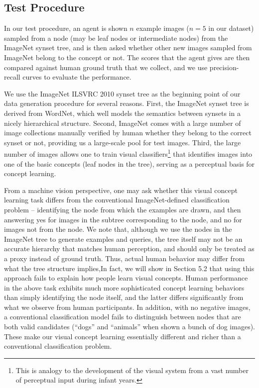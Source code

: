 \subsection{Test Procedure}

In our test procedure, an agent is shown $n$ example images ($n=5$ in our dataset) sampled from a node (may be leaf nodes or intermediate nodes) from the ImageNet synset tree, and is then asked whether other new images sampled from ImageNet belong to the concept or not. The scores that the agent gives are then compared against human ground truth that we collect, and we use precision-recall curves to evaluate the performance.

We use the ImageNet ILSVRC 2010 synset tree as the beginning point of our data generation procedure for several reasons. First, the ImageNet synset tree is derived from WordNet, which well models the semantics between synsets in a nicely hierarchical structure. Second, ImageNet comes with a large number of image collections manually verified by human whether they belong to the correct synset or not, providing us a large-scale pool for test images. Third, the large number of images allows one to train visual classifiers\footnote{This is analogy to the development of the visual system from a vast number of perceptual input during infant years.} that identifies images into one of the basic concepts (leaf nodes in the tree), serving as a perceptual basis for concept learning.

From a machine vision perspective, one may ask whether this visual concept learning task differs from the conventional ImageNet-defined classification problem -- identifying the node from which the examples are drawn, and then answering yes for images in the subtree corresponding to the node, and no for images not from the node. We note that, although we use the nodes in the ImageNet tree to generate examples and queries, the tree itself may not be an accurate hierarchy that matches human perception, and should only be treated as a proxy instead of ground truth. Thus, actual human behavior may differ from what the tree structure implies,In fact, we will show in Section 5.2 that using this approach fails to explain how people learn visual concepts. Human performance in the above task exhibits much more sophisticated concept learning behaviors than simply identifying the node itself, and the latter differs significantly from what we observe from human participants. In addition, with no negative images, a conventional classification model fails to distinguish between nodes that are both valid candidates (\eg ``dogs'' and ``animals'' when shown a bunch of dog images). These make our visual concept learning essentially different and richer than a conventional classification problem.

